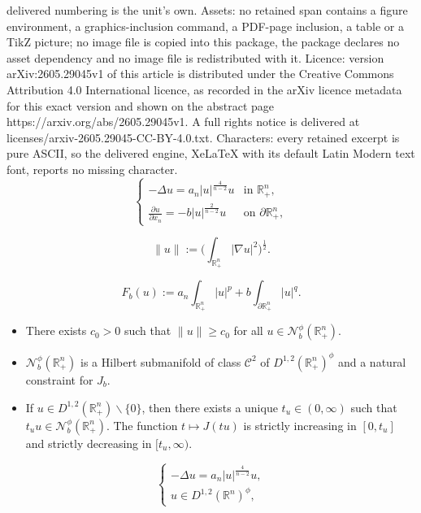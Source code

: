 \documentclass[10pt,a4paper]{amsart}
\def\cC{\mathcal{C}}
\def\cN{\mathcal{N}}
\def\hn{\mathbb{R}^n_+}
\def\idhn{\int_{\partial\hn}}
\def\ihn{\int_{\hn}}
\def\rn{\mathbb{R}^n}
\begin{document}
delivered numbering is the unit's own. Assets: no retained span contains a figure environment, a graphics-inclusion command, a PDF-page inclusion, a table or a TikZ picture; no image file is copied into this package, the package declares no asset dependency and no image file is redistributed with it. Licence: version arXiv:2605.29045v1 of this article is distributed under the Creative Commons Attribution 4.0 International licence, as recorded in the arXiv licence metadata for this exact version and shown on the abstract page https://arxiv.org/abs/2605.29045v1. A full rights notice is delivered at licenses/arxiv-2605.29045-CC-BY-4.0.txt. Characters: every retained excerpt is pure ASCII, so the delivered engine, XeLaTeX with its default Latin Modern text font, reports no missing character.
\begin{equation}\label{problem_cap}
\begin{cases}
 -\Delta u = a_n|u|^\frac{4}{n-2}u &\text{in \ } \hn,\\
 \frac{\partial u}{\partial x_n} = -b|u|^\frac{2}{n-2}u &\text{on \ }\partial\hn,
\end{cases}
\end{equation}

\begin{equation}\label{eq:norm}
\|u\|:=\Big(\ihn|\nabla u|^2\Big)^\frac{1}{2}.
\end{equation}

\begin{equation}\label{eq:F}
F_b(u):=a_n\ihn |u|^p + b\idhn|u|^q.
\end{equation}

\begin{lemma}\label{lem:nehari}
\begin{itemize}
\item[$(a)$]There exists $c_0>0$ such that $\|u\|\geq c_0$ for all $u\in\cN^\phi_b(\hn)$.
\item[$(b)$]$\cN^\phi_b(\hn)$ is a Hilbert submanifold of class $\cC^2$ of $D^{1,2}(\hn)^\phi$ and a natural constraint for $J_b$.
\item[$(c)$]If $u\in D^{1,2}(\hn)\smallsetminus\{0\}$, then there exists a unique $t_u\in(0,\infty)$ such that $t_uu\in\cN^\phi_b(\hn)$. The function $t\mapsto J(tu)$ is strictly increasing in $[0,t_u]$ and strictly decreasing in $[t_u,\infty)$.
\end{itemize}
\end{lemma}

\begin{equation}\label{problem_rn}
\begin{cases}
 -\Delta u = a_n|u|^\frac{4}{n-2}u,\\
 u\in D^{1,2}(\rn)^\phi,
\end{cases}
\end{equation}
\end{document}
